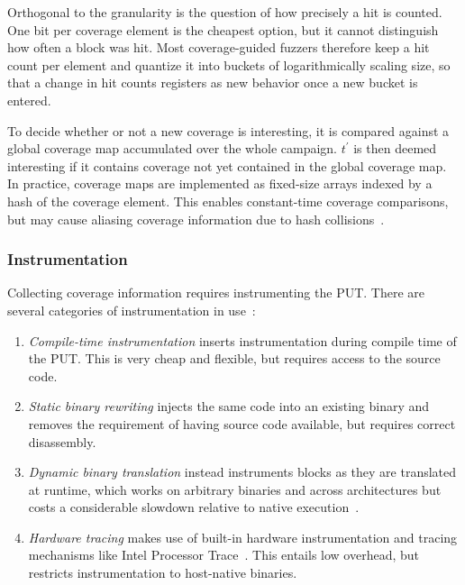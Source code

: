 Orthogonal to the granularity is the question of how precisely a hit is counted.
One bit per coverage element is the cheapest option, but it cannot distinguish how often a block was hit.
Most coverage-guided fuzzers therefore keep a hit count per element and quantize it into
buckets of logarithmically scaling size, so that a change in hit counts registers as new behavior once a new bucket is entered.

To decide whether or not a new coverage is interesting, it is compared against
a global coverage map accumulated over the whole campaign.
$t^\prime$ is then deemed interesting if it contains coverage not yet contained in the global coverage map.
In practice, coverage maps are implemented as fixed-size arrays indexed by a hash of the coverage element.
This enables constant-time coverage comparisons, but may cause aliasing coverage information due to hash collisions~\cite{gan_collafl_2018}.

\subsubsection{Instrumentation}

Collecting coverage information requires instrumenting the PUT.
There are several categories of instrumentation in use~\cite{fioraldi_afl_nodate}:

\begin{enumerate}
  \item \emph{Compile-time instrumentation}
    inserts instrumentation during compile time of the PUT.
    This is very cheap and flexible, but requires access to the source code.

  \item \emph{Static binary rewriting}
    injects the same code into an existing binary and removes the requirement
    of having source code available, but requires correct disassembly.

  \item \emph{Dynamic binary translation}
    instead instruments blocks as they are translated at runtime, which works
    on arbitrary binaries and across architectures but costs a considerable
    slowdown relative to native execution~\cite{bellard_qemu_2005}.

  \item \emph{Hardware tracing}
    makes use of built-in hardware instrumentation and tracing mechanisms like
    Intel Processor Trace~\cite{zhang_ptfuzz_2018}. This entails low overhead,
    but restricts instrumentation to host-native binaries.
\end{enumerate}

